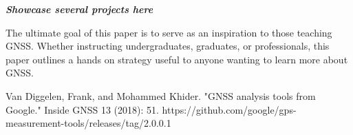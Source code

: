 \documentclass[12pt, conference, onecolumn, draftclsnofoot]{IEEEtran}
\begin{document}
\textit{\textbf{Showcase several projects here}}

The ultimate goal of this paper is to serve as an inspiration to those teaching GNSS.
Whether instructing undergraduates, graduates, or professionals, this paper outlines a hands on strategy useful to anyone wanting to learn more about GNSS.

\begin{thebibliography}{00}
     Van Diggelen, Frank, and Mohammed Khider. "GNSS analysis tools from Google." Inside GNSS 13 (2018): 51. 
     https://github.com/google/gps-measurement-tools/releases/tag/2.0.0.1
    
\end{thebibliography}
\end{document}
